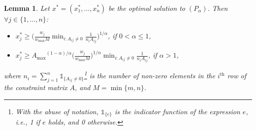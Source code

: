 \documentclass[11pt]{article}
\newtheorem{lemma}[theorem]{Lemma}
\newif\iffullpaper
\begin{document}
\begin{lemma}\label{lemma:lower-bound}
Let $x^* = (x_1^*,...,x_n^*)$ be the optimal solution to $(P_\alpha)$. Then $\forall j\in \{1,...,n\}$:
\begin{itemize}
\itemsep0pt
\item $x_j^*\geq \big(\frac{w_j}{w_{\max}M}\min_{i: A_{ij}\neq 0}\frac{1}{n_i A_{ij}}\big)^{1/\alpha}$, if  $0<\alpha\leq1$,
\item $x_j^* \geq {{A_{\max}}}^{(1-\alpha)/\alpha}\big(\frac{w_j}{w_{\max}M}\big)^{1/\alpha}\min_{i: A_{ij}\neq 0}\frac{1}{n_i A_{ij}}$, if $\alpha>1$,
\end{itemize}
where $n_i = \sum_{j=1}^n \mathds{1}_{\{A_{ij}\neq 0\}}$\footnote{With the abuse of notation, $\mathds{1}_{\{e\}}$ is the indicator function of the expression $e$, i.e., 1 if $e$ holds, and 0 otherwise.} is the number of non-zero elements in the $i^{\text{th}}$ row of the constraint matrix $A$, and $M=\min\{m, n\}$.
\end{lemma}
\iffullpaper
\end{document}
